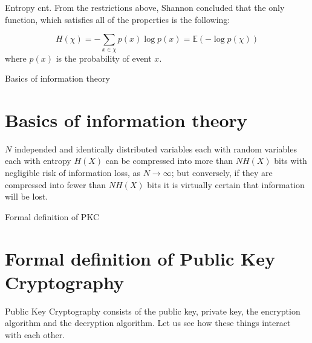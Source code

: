 \documentclass{beamer}
\begin{document}
\begin{frame}{Entropy cnt.}
    From the restrictions above, Shannon concluded that the only function,
    which satisfies all of the properties is the following:
    
    \begin{equation}
        H(\chi) = -\sum_{x \in \chi}{p(x) \log p(x) = \mathbb{E}(- \log p(\chi))}
    \end{equation}
    where $p(x)$ is the probability of event $x$.

\end{frame}

\begin{frame}{Basics of information theory}
    \section{Basics of information theory}
    \begin{theorem}
    $N$ independed and identically distributed variables each with random 
    variables each with entropy $H(X)$ can be compressed into more than $NH(X)$ 
    bits with negligible risk of information loss, as $N \to \infty$; but 
    conversely, if they are compressed into fewer than $NH(X)$ bits it is 
    virtually certain that information will be lost.
    \end{theorem}
\end{frame}

\begin{frame}{Formal definition of PKC}
    \section{Formal definition of Public Key Cryptography}
    Public Key Cryptography consists of the public key, private key, 
    the encryption algorithm and the decryption algorithm. Let us see how these 
    things interact with each other.
\end{frame}
\end{document}
